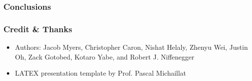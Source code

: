 \documentclass[11pt,xcolor={dvipsnames},usepdftitle=false]{beamer}
\begin{document}
\begin{frame}
    \frametitle{Conclusions}
\end{frame}

\begin{frame}
    \frametitle{Credit \& Thanks}
    \begin{itemize}
        \item Authors: Jacob Myers, Christopher Caron, Nishat Helaly, Zhenyu Wei, Justin Oh, Zack Gotobed, Kotaro Yabe, and Robert J. Niffenegger
        \item LATEX presentation template by Prof. Pascal Michaillat
    \end{itemize} 
\end{frame}
\end{document}
